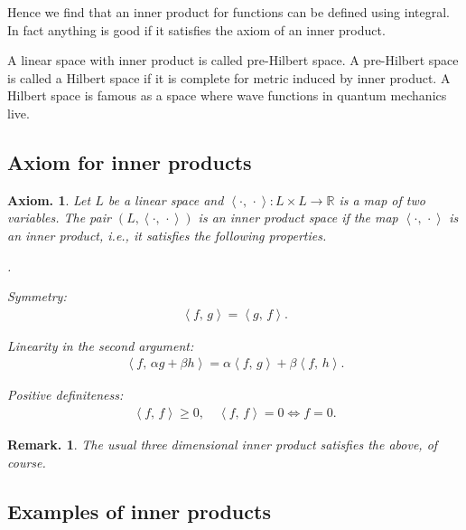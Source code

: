 \documentclass[openany, a4paper, oneside]{book}
\newcounter{enum2}
\renewenvironment{enumerate}{%
\begin{list}%
{%
\arabic{enum2}.\ \,%
}%
{%
\usecounter{enum2}
\setlength{\itemindent}{0pt}%
\setlength{\leftmargin}{6pt}%
\setlength{\rightmargin}{0pt}%
\setlength{\labelsep}{0pt}%
\setlength{\labelwidth}{6pt}%
\setlength{\itemsep}{0pt}%
\setlength{\parsep}{0pt}%
\setlength{\listparindent}{0pt}%
}
}{%
\end{list}%
}
\theoremstyle{break}
\newtheorem{axm}[thm]{Axiom.}
\theoremstyle{breakdefn}
\newtheorem{rem}[thm]{Remark.}
\newcommand{\rbk}[1]{\left (#1\right)}
\newcommand{\bkt}[2]{\left\langle#1,\,#2\right\rangle}
\newcommand{\bbR}{\mathbb{R}}
\begin{document}
Hence we find that an inner product for functions
can be defined using integral.
In fact anything is good if it satisfies the axiom of an inner product.

A linear space with inner product is called pre-Hilbert space.
A pre-Hilbert space is called a Hilbert space if it is complete for metric induced by inner product.
A Hilbert space is famous as a space where wave functions in quantum mechanics live.
\subsection{Axiom for inner products}
\label{sec-4-1-3-2}

\begin{axm}
 Let $L$ be a linear space and $\bkt{\cdot}{\cdot} \colon L \times L \to \bbR$ is a map of two variables.
 The pair $\rbk{L, \bkt{\cdot}{\cdot}}$ is an inner product space if the map $\bkt{\cdot}{\cdot}$ is an inner product,
 i.e., it satisfies the following properties.
\begin{enumerate}
\item Symmetry:
  \begin{align}
   \bkt{f}{g} = \bkt{g}{f}.
  \end{align}
\item Linearity in the second argument:
  \begin{align}
   \bkt{f}{\alpha g + \beta h}
   =
   \alpha \bkt{f}{g} + \beta \bkt{f}{h}.
  \end{align}
\item Positive definiteness:
  \begin{align}
   \bkt{f}{f} \geq 0, \quad
   \bkt{f}{f} = 0 \Longleftrightarrow f = 0.
  \end{align}
\end{enumerate}
\end{axm}
\begin{rem}
 The usual three dimensional inner product satisfies the above, of course.
\end{rem}
\subsection{Examples of inner products}
\label{sec-4-1-3-3}
\end{document}
